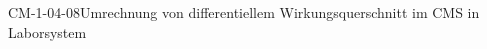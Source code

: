 
\begin{PROP}{CM-1-04-08}{Umrechnung von differentiellem Wirkungsquerschnitt im CMS in Laborsystem}
\end{PROP}
